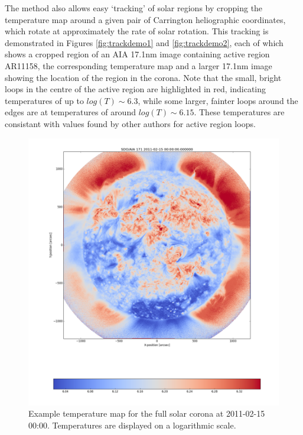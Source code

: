 \documentclass[referee,a4paper,12pt]{swsc}
\begin{document}
\begin{linenumbers}
The  method also allows easy `tracking' of solar regions by cropping the temperature map around a given pair of Carrington heliographic coordinates, which rotate at approximately the rate of solar rotation.
This tracking is demonstrated in Figures \ref{fig:trackdemo1} and \ref{fig:trackdemo2}, each of which shows a cropped region of an AIA 17.1nm image containing active region AR11158, the corresponding temperature map and a larger 17.1nm image showing the location of the region in the corona.
Note that the small, bright loops in the centre of the active region are highlighted in red, indicating temperatures of up to $log(T) \sim 6.3$, while some larger, fainter loops around the edges are at temperatures of around $log(T) \sim 6.15$.
These temperatures are consistant with values found by other authors for active region loops. %

\begin{figure}
	\centering
		\includegraphics[width=\columnwidth]{2011-02-15T00_00_00.png}
	\caption{Example temperature map for the full solar corona at 2011-02-15 00:00. Temperatures are displayed on a logarithmic scale.}
	\label{fig:example_tmap}
\end{figure}


\end{linenumbers}
\end{document}
